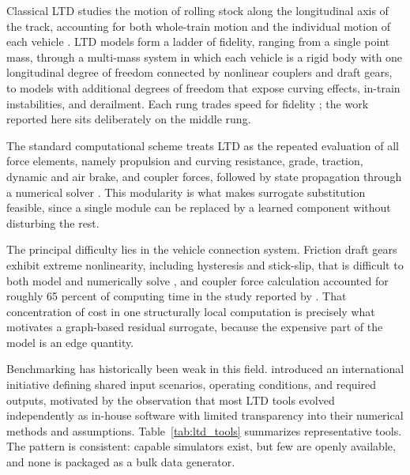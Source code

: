 \documentclass[numbered]{trbunofficial}
\begin{document}
Classical LTD studies the motion of rolling stock along the longitudinal axis of the track, accounting for both whole-train motion and the individual motion of each vehicle \citep{Cole2006HandbookLTD}. LTD models form a ladder of fidelity, ranging from a single point mass, through a multi-mass system in which each vehicle is a rigid body with one longitudinal degree of freedom connected by nonlinear couplers and draft gears, to models with additional degrees of freedom that expose curving effects, in-train instabilities, and derailment. Each rung trades speed for fidelity \citep{Wu2016OverviewLTD}; the work reported here sits deliberately on the middle rung.

The standard computational scheme treats LTD as the repeated evaluation of all force elements, namely propulsion and curving resistance, grade, traction, dynamic and air brake, and coupler forces, followed by state propagation through a numerical solver \citep{Wu2018ComputingSchemesLTD}. This modularity is what makes surrogate substitution feasible, since a single module can be replaced by a learned component without disturbing the rest.

The principal difficulty lies in the vehicle connection system. Friction draft gears exhibit extreme nonlinearity, including hysteresis and stick-slip, that is difficult to both model and numerically solve \citep{Wu2016OverviewLTD}, and coupler force calculation accounted for roughly 65 percent of computing time in the study reported by \citet{Wu2018ComputingSchemesLTD}. That concentration of cost in one structurally local computation is precisely what motivates a graph-based residual surrogate, because the expensive part of the model is an edge quantity.

Benchmarking has historically been weak in this field. \citet{Spiryagin2017BenchmarkQuestions} introduced an international initiative defining shared input scenarios, operating conditions, and required outputs, motivated by the observation that most LTD tools evolved independently as in-house software with limited transparency into their numerical methods and assumptions. Table~\ref{tab:ltd_tools} summarizes representative tools. The pattern is consistent: capable simulators exist, but few are openly available, and none is packaged as a bulk data generator.
\end{document}
